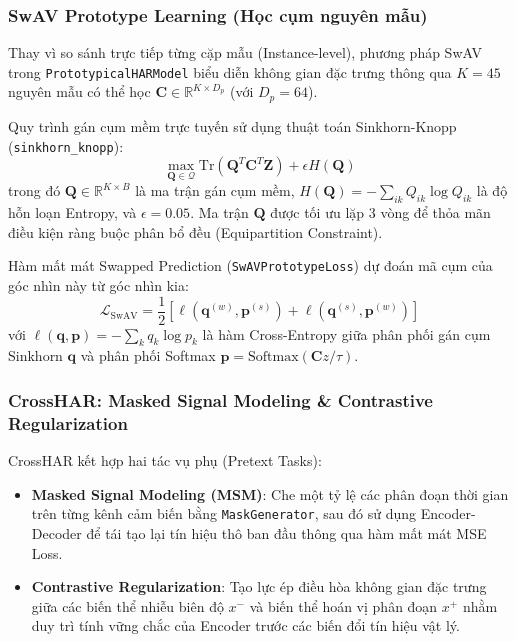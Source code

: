 \subsubsection{SwAV Prototype Learning (Học cụm nguyên mẫu)}
Thay vì so sánh trực tiếp từng cặp mẫu (Instance-level), phương pháp SwAV trong \texttt{PrototypicalHARModel} biểu diễn không gian đặc trưng thông qua $K=45$ nguyên mẫu có thể học $\mathbf{C} \in \mathbb{R}^{K \times D_p}$ (với $D_p = 64$).

Quy trình gán cụm mềm trực tuyến sử dụng thuật toán Sinkhorn-Knopp (\texttt{sinkhorn\_knopp}):
\begin{equation}
    \max_{\mathbf{Q} \in \mathcal{Q}} \text{Tr}(\mathbf{Q}^T \mathbf{C}^T \mathbf{Z}) + \epsilon H(\mathbf{Q})
\end{equation}
trong đó $\mathbf{Q} \in \mathbb{R}^{K \times B}$ là ma trận gán cụm mềm, $H(\mathbf{Q}) = -\sum_{ik} Q_{ik} \log Q_{ik}$ là độ hỗn loạn Entropy, và $\epsilon = 0.05$. Ma trận $\mathbf{Q}$ được tối ưu lặp $3$ vòng để thỏa mãn điều kiện ràng buộc phân bổ đều (Equipartition Constraint).

Hàm mất mát Swapped Prediction (\texttt{SwAVPrototypeLoss}) dự đoán mã cụm của góc nhìn này từ góc nhìn kia:
\begin{equation}
    \mathcal{L}_{\text{SwAV}} = \frac{1}{2} \left[ \ell(\mathbf{q}^{(w)}, \mathbf{p}^{(s)}) + \ell(\mathbf{q}^{(s)}, \mathbf{p}^{(w)}) \right]
\end{equation}
với $\ell(\mathbf{q}, \mathbf{p}) = -\sum_{k} q_k \log p_k$ là hàm Cross-Entropy giữa phân phối gán cụm Sinkhorn $\mathbf{q}$ và phân phối Softmax $\mathbf{p} = \text{Softmax}(\mathbf{C} z / \tau)$.

\subsubsection{CrossHAR: Masked Signal Modeling \& Contrastive Regularization}
CrossHAR kết hợp hai tác vụ phụ (Pretext Tasks):
\begin{itemize}
    \item \textbf{Masked Signal Modeling (MSM)}: Che một tỷ lệ các phân đoạn thời gian trên từng kênh cảm biến bằng \texttt{MaskGenerator}, sau đó sử dụng Encoder-Decoder để tái tạo lại tín hiệu thô ban đầu thông qua hàm mất mát MSE Loss.
    \item \textbf{Contrastive Regularization}: Tạo lực ép điều hòa không gian đặc trưng giữa các biến thể nhiễu biên độ $x^{-}$ và biến thể hoán vị phân đoạn $x^{+}$ nhằm duy trì tính vững chắc của Encoder trước các biến đổi tín hiệu vật lý.
\end{itemize}


